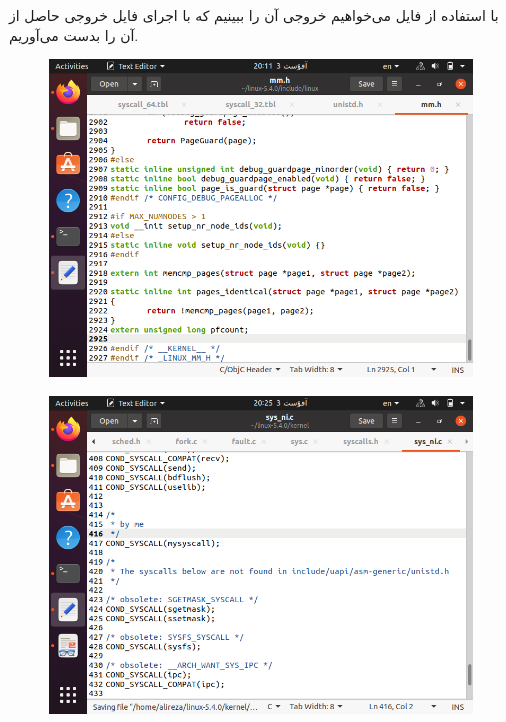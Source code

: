 \begin{itemize}
\begin{enumerate}
 			 با استفاده از فایل  می‌خواهیم خروجی آن را ببینیم که با اجرای فایل خروجی  حاصل از  آن را بدست می‌آوریم.
 			 \begin{figure}[!hpbt]
 			 	\centering
 			 	\includegraphics[scale=0.4]{img/pic4.png}
 			 \end{figure}
 			 \begin{figure}[!hpbt]
 			 	\centering
 			 	\includegraphics[scale=0.4]{img/pic10.png}
 			 \end{figure}
 		 \begin{figure}[!hpbt]
 		 	\centering

\end{figure}
\end{enumerate}
\end{itemize}
